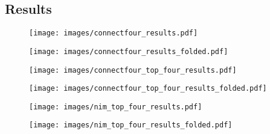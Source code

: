 \subsection{Results}
\begin{figure}[H]
    \centering
    \texttt{[image: images/connectfour\_results.pdf]}
    \caption{}
    \label{fig:c4_results}
\end{figure}

\begin{figure}[H]
    \centering
    \texttt{[image: images/connectfour\_results\_folded.pdf]}
    \caption{}
    \label{fig:c4_results_folded}
\end{figure}

\begin{figure}[H]
    \centering
    \texttt{[image: images/connectfour\_top\_four\_results.pdf]}
    \caption{}
    \label{fig:c4_top_four_results}
\end{figure}

\begin{figure}[H]
    \centering
    \texttt{[image: images/connectfour\_top\_four\_results\_folded.pdf]}
    \caption{}
    \label{fig:c4_top_four_results_folded}
\end{figure}

\begin{figure}[H]
    \centering
    \texttt{[image: images/nim\_top\_four\_results.pdf]}
    \caption{}
    \label{fig:nim_top_four_results}
\end{figure}

\begin{figure}[H]
    \centering
    \texttt{[image: images/nim\_top\_four\_results\_folded.pdf]}
    \caption{}
    \label{fig:nim_top_four_results_folded}
\end{figure}